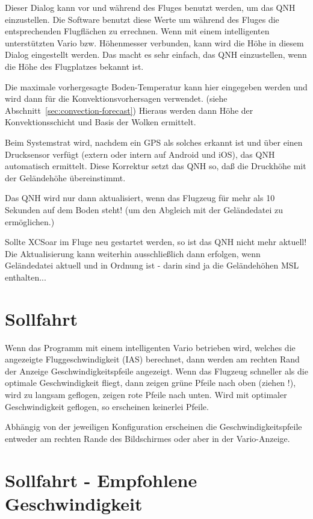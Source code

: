 Dieser Dialog kann vor und während des Fluges benutzt werden, um das QNH einzustellen.
Die Software benutzt diese Werte um während des Fluges die entsprechenden Flugflächen
zu errechnen. Wenn mit einem intelligenten unterstützten Vario bzw. Höhenmesser verbunden,
kann wird die Höhe in diesem Dialog eingestellt werden. Das macht es sehr einfach,
das QNH einzustellen, wenn die Höhe des Flugplatzes bekannt ist.


Die maximale vorhergesagte Boden-Temperatur kann hier eingegeben werden und wird dann für die
Konvektionsvorhersagen verwendet. (siehe Abschnitt~\ref{sec:convection-forecast})
Hieraus werden dann Höhe der Konvektionsschicht und Basis der Wolken ermittelt.


Beim Systemstrat wird, nachdem ein GPS als solches erkannt ist und über einen Drucksensor verfügt
(extern oder intern auf Android und iOS),
das QNH automatisch ermittelt.  Diese Korrektur setzt das QNH so, daß die Druckhöhe mit der
Geländehöhe übereinstimmt.

Das QNH wird nur dann aktualisiert, wenn das Flugzeug für mehr als 10 Sekunden auf dem Boden
steht! (um den Abgleich mit der Geländedatei zu ermöglichen.)

Sollte \textsf{XCSoar} im Fluge neu gestartet werden, so ist das QNH nicht mehr aktuell! 
Die Aktualisierung kann weiterhin ausschließlich dann erfolgen, wenn Geländedatei aktuell und in
Ordnung ist - darin sind ja die Geländehöhen MSL enthalten...

\section{Sollfahrt}

Wenn das Programm mit einem intelligenten Vario betrieben wird, welches die angezeigte
Fluggeschwindigkeit (IAS) berechnet, dann werden am rechten Rand der Anzeige Geschwindigkeitspfeile
angezeigt. Wenn das Flugzeug schneller als die optimale Geschwindigkeit fliegt, dann zeigen grüne Pfeile
nach oben (ziehen !), wird zu langsam geflogen, zeigen rote Pfeile nach unten. Wird mit optimaler
Geschwindigkeit geflogen, so erscheinen keinerlei Pfeile.


Abhängig von der jeweiligen Konfiguration erscheinen die Geschwindigkeitspfeile entweder
am rechten Rande des Bildschirmes oder aber in der Vario-Anzeige.

\section{Sollfahrt - Empfohlene Geschwindigkeit}

